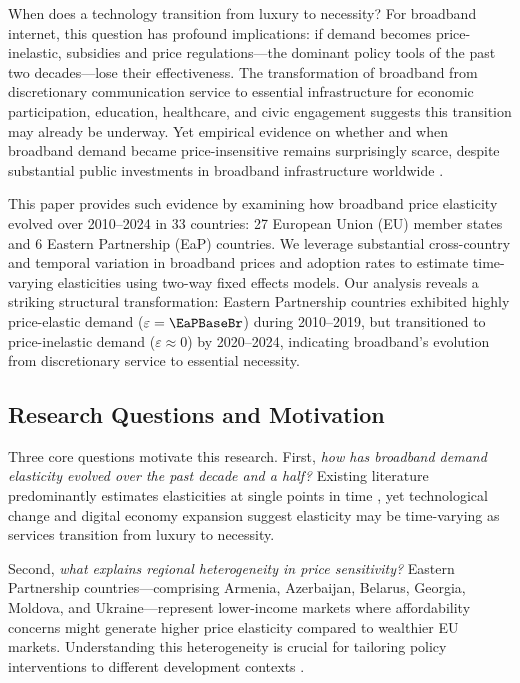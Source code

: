 When does a technology transition from luxury to necessity? For broadband internet, this question has profound implications: if demand becomes price-inelastic, subsidies and price regulations---the dominant policy tools of the past two decades---lose their effectiveness. The transformation of broadband from discretionary communication service to essential infrastructure for economic participation, education, healthcare, and civic engagement \citep{katz2010impact} suggests this transition may already be underway. Yet empirical evidence on whether and when broadband demand became price-insensitive remains surprisingly scarce, despite substantial public investments in broadband infrastructure worldwide \citep{oecd2020broadband}.

This paper provides such evidence by examining how broadband price elasticity evolved over 2010--2024 in 33 countries: 27 European Union (EU) member states and 6 Eastern Partnership (EaP) countries. We leverage substantial cross-country and temporal variation in broadband prices and adoption rates to estimate time-varying elasticities using two-way fixed effects models. Our analysis reveals a striking structural transformation: Eastern Partnership countries exhibited highly price-elastic demand ($\varepsilon = \EaPBaseBr$) during 2010--2019, but transitioned to price-inelastic demand ($\varepsilon \approx 0$) by 2020--2024, indicating broadband's evolution from discretionary service to essential necessity.

\subsection{Research Questions and Motivation}

Three core questions motivate this research. First, \textit{how has broadband demand elasticity evolved over the past decade and a half?} Existing literature predominantly estimates elasticities at single points in time \citep{dauvin2014estimating}, yet technological change and digital economy expansion suggest elasticity may be time-varying as services transition from luxury to necessity. 

Second, \textit{what explains regional heterogeneity in price sensitivity?} Eastern Partnership countries---comprising Armenia, Azerbaijan, Belarus, Georgia, Moldova, and Ukraine---represent lower-income markets where affordability concerns might generate higher price elasticity compared to wealthier EU markets. Understanding this heterogeneity is crucial for tailoring policy interventions to different development contexts \citep{waverman2001telecommunications}.

